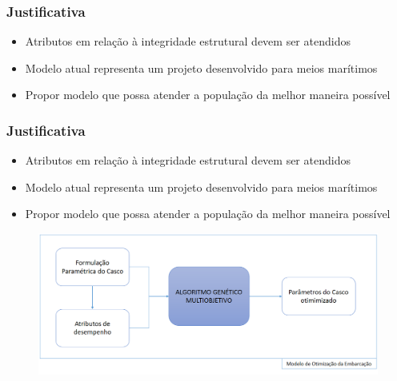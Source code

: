 \documentclass{beamer}
\begin{document}
\begin{frame}
\frametitle{Justificativa}
\begin{itemize}
	\item Atributos em relação à integridade estrutural devem ser atendidos
	\item \alert{Modelo atual representa um projeto desenvolvido para meios marítimos}
	\item Propor modelo que possa atender a população da melhor maneira possível  
\end{itemize}
\end{frame}
\begin{frame}
\frametitle{Justificativa}
\begin{itemize}
	\item Atributos em relação à integridade estrutural devem ser atendidos
	\item Modelo atual representa um projeto desenvolvido para meios marítimos
	\item \alert{Propor modelo que possa atender a população da melhor maneira possível}  
\end{itemize}
\end{frame}
\begin{frame}
\begin{figure}[h]
\centering
\includegraphics[scale=0.37]{img}
\caption{}
\label{fig:modelo}
\end{figure}
\end{frame}
\end{document}
